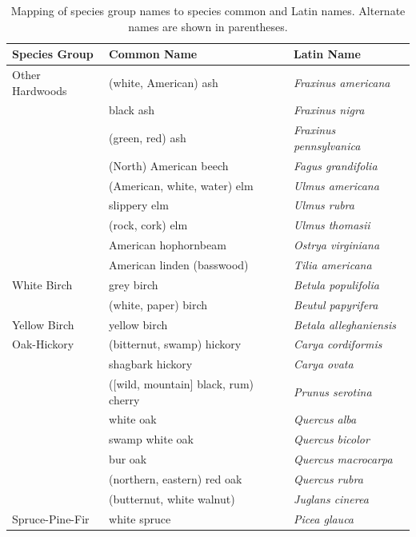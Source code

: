 \documentclass{article}
\begin{document}
\vspace{-5em}
\begin{table}
\caption{Mapping of species group names to species common and Latin names. Alternate names are shown in parentheses.}
\vspace{1em}
\label{tab:a_speciesgroups}
\centering
{\small
\begin{tabular}{lll}
\toprule
Species Group & Common Name & Latin Name \\
\midrule
Other Hardwoods        &     (white, American) ash &   \emph{Fraxinus americana} \\
       &     black ash &   \emph{Fraxinus nigra} \\
       &     (green, red) ash &   \emph{Fraxinus pennsylvanica} \\
       &     (North) American beech &   \emph{Fagus grandifolia} \\
       &     (American, white, water) elm &   \emph{Ulmus americana} \\
       &     slippery elm &   \emph{Ulmus rubra} \\
       &     (rock, cork) elm &   \emph{Ulmus thomasii} \\
       &     American hophornbeam &   \emph{Ostrya virginiana} \\
       &     American linden (basswood) &   \emph{Tilia americana} \\
White Birch        &     grey birch &   \emph{Betula populifolia} \\
        &     (white, paper) birch &   \emph{Beutul papyrifera} \\
Yellow Birch        &     yellow birch &   \emph{Betala alleghaniensis} \\
Oak-Hickory &     (bitternut, swamp) hickory &   \emph{Carya cordiformis} \\
&     shagbark hickory &   \emph{Carya ovata} \\
&     ([wild, mountain] black, rum) cherry &   \emph{Prunus serotina} \\
&     white oak &   \emph{Quercus alba} \\
&     swamp white oak &   \emph{Quercus bicolor} \\
&     bur oak &   \emph{Quercus macrocarpa} \\
&     (northern, eastern) red oak &   \emph{Quercus rubra} \\
&     (butternut, white walnut) &   \emph{Juglans cinerea} \\
Spruce-Pine-Fir       &    white spruce &   \emph{Picea glauca} \\

\end{tabular}}
\end{table}
\end{document}
